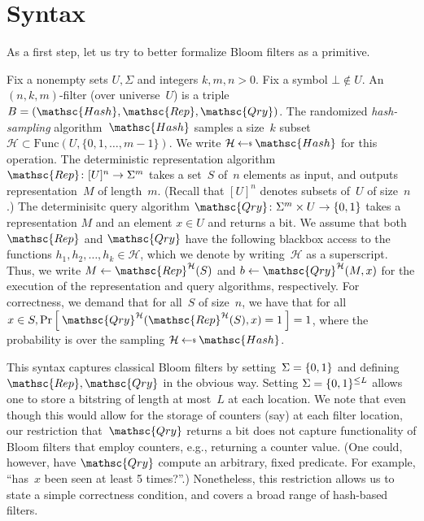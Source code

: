 \section{Syntax}
As a first step, let us try to better formalize Bloom filters as a primitive.

Fix a nonempty sets $U,\Sigma$ and integers $k,m,n>0$.  Fix a symbol $\bot \not\in U$.  An $(n,k,m)$-filter (over universe~$U$) is a triple  $B=(\mathsc{Hash},\mathsc{Rep},\mathsc{Qry})$.   
%
The randomized \emph{hash-sampling} algorithm~$\mathsc{Hash}$ samples a size~$k$ subset~$\mathcal{H} \subset \mathrm{Func}(U,\{0,1,\ldots,m-1\})$.  We write $\mathcal{H} \getsr \mathsc{Hash}$ for this operation.
%
The deterministic representation algorithm $\mathsc{Rep}\colon [U]^n \rightarrow \Sigma^m$ takes a set~$S$ of~$n$ elements as input, and outputs representation~$M$ of length~$m$.  (Recall that $[U]^n$ denotes subsets of~$U$ of size~$n$.)
%
The determinisitc query algorithm $\mathsc{Qry}\colon \Sigma^m \times U \rightarrow \bits$ takes a representation $M$ and an element $x \in U$ and returns a bit.  
%
We assume that both $\mathsc{Rep}$ and $\mathsc{Qry}$ have the following blackbox access to the functions $h_1,h_2,\ldots,h_k \in \mathcal{H}$, which we denote by writing~$\mathcal{H}$ as a superscript.   Thus, we write $M \gets \mathsc{Rep}^{\mathcal{H}}(S)$ and $b \gets \mathsc{Qry}^{\mathcal{H}}(M,x)$ for the execution of the representation and query algorithms, respectively.
%
For correctness, we demand that for all~$S$ of size~$n$, we have that for all $x \in S, \Prob{\mathsc{Qry}^{\mathcal{H}}(\mathsc{Rep}^{\mathcal{H}}(S),x)=1}=1$, where the probability is over the sampling $\mathcal{H}\getsr\mathsc{Hash}$.  

This syntax captures classical Bloom filters by setting~$\Sigma=\{0,1\}$ and defining $\mathsc{Rep},\mathsc{Qry}$ in the obvious way.  Setting $\Sigma=\{0,1\}^{\leq L}$ allows one to store a bitstring of length at most~$L$ at each location.   We note that even though this would allow for the storage of counters (say) at each filter location, our restriction that~$\mathsc{Qry}$ returns a bit does not capture functionality of Bloom filters that employ counters, e.g., returning a counter value. (One could, however, have $\mathsc{Qry}$ compute an arbitrary, fixed predicate.  For example, ``has~$x$ been seen at least 5 times?''.)  Nonetheless, this restriction allows us to state a simple correctness condition, and covers a broad range of hash-based filters.

